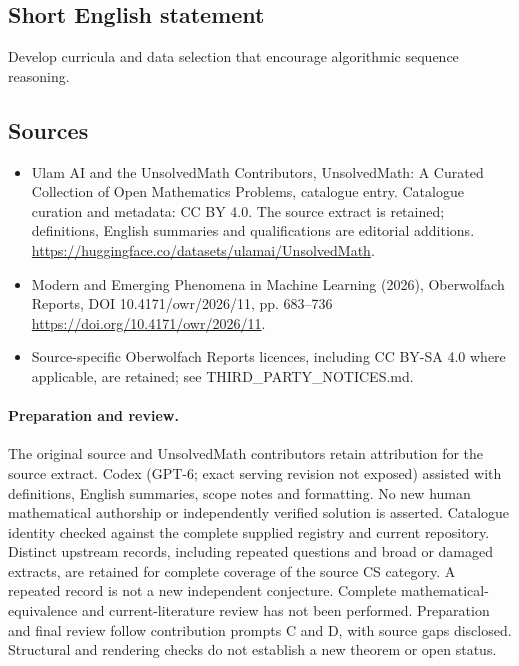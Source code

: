 \documentclass[11pt]{article}
\begin{document}
\subsection{Short English statement}
Develop curricula and data selection that encourage algorithmic sequence reasoning.
\subsection{Sources}
\begin{itemize}
\item[\hypertarget{source:statement:1}{S1}] Ulam AI and the UnsolvedMath Contributors, UnsolvedMath: A Curated Collection of Open Mathematics Problems, catalogue entry. Catalogue curation and metadata: CC BY 4.0. The source extract is retained; definitions, English summaries and qualifications are editorial additions.
\url{https://huggingface.co/datasets/ulamai/UnsolvedMath}.
\item[\hypertarget{source:statement:2}{S2}] Modern and Emerging Phenomena in Machine Learning (2026), Oberwolfach Reports, DOI 10.4171/owr/2026/11, pp. 683--736
\url{https://doi.org/10.4171/owr/2026/11}.
\item Source-specific Oberwolfach Reports licences, including CC BY-SA 4.0 where applicable, are retained; see THIRD\_PARTY\_NOTICES.md.
\end{itemize}
\paragraph{Preparation and review.}
The original source and UnsolvedMath contributors retain attribution for the source extract. Codex (GPT-6; exact serving revision not exposed) assisted with definitions, English summaries, scope notes and formatting. No new human mathematical authorship or independently verified solution is asserted. Catalogue identity checked against the complete supplied registry and current repository. Distinct upstream records, including repeated questions and broad or damaged extracts, are retained for complete coverage of the source CS category. A repeated record is not a new independent conjecture. Complete mathematical-equivalence and current-literature review has not been performed. Preparation and final review follow contribution prompts C and D, with source gaps disclosed. Structural and rendering checks do not establish a new theorem or open status.
\label{end:statement}
\end{document}
